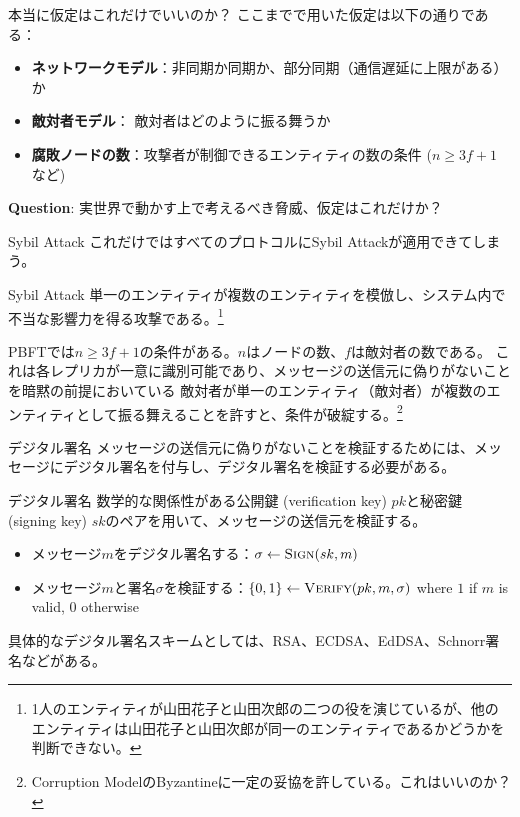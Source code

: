 \documentclass[aspectratio=169,10pt]{beamer}
\newenvironment{proofblock}[1][]
{\begin{block}{#1}\vspace{0.5em}}
{\vspace{0.5em}\end{block}}
\newenvironment{outlineblock}[1][]
{\begin{tcolorbox}[colframe=black, colback=white, boxrule=1pt, boxsep=5pt]}
{\end{tcolorbox}}
\begin{document}
\begin{frame}{本当に仮定はこれだけでいいのか？}
ここまでで用いた仮定は以下の通りである：
\begin{itemize}
    \item \textbf{ネットワークモデル}：非同期か同期か、部分同期（通信遅延に上限がある）か
    \item \textbf{敵対者モデル}： 敵対者はどのように振る舞うか
    \item \textbf{腐敗ノードの数}：攻撃者が制御できるエンティティの数の条件 ($n \geq 3f+1$ など)
\end{itemize}

\textbf{Question}: 実世界で動かす上で考えるべき脅威、仮定はこれだけか？
\end{frame}

\begin{frame}{Sybil Attack}
これだけではすべてのプロトコルにSybil Attackが適用できてしまう。

\begin{proofblock}[Sybil Attack]
単一のエンティティが複数のエンティティを模倣し、システム内で不当な影響力を得る攻撃である。\footnote{1人のエンティティが山田花子と山田次郎の二つの役を演じているが、他のエンティティは山田花子と山田次郎が同一のエンティティであるかどうかを判断できない。}
\end{proofblock}

\begin{outlineblock}[Sybil Attackの条件]
    PBFTでは$n \geq 3f+1$の条件がある。$n$はノードの数、$f$は敵対者の数である。
    これは各レプリカが一意に識別可能であり、メッセージの送信元に偽りがないことを暗黙の前提においている
    敵対者が単一のエンティティ（敵対者）が複数のエンティティとして振る舞えることを許すと、条件が破綻する。\footnote{Corruption ModelのByzantineに一定の妥協を許している。これはいいのか？}
\end{outlineblock}
\end{frame}

\begin{frame}{デジタル署名}
メッセージの送信元に偽りがないことを検証するためには、メッセージにデジタル署名を付与し、デジタル署名を検証する必要がある。

\begin{proofblock}[デジタル署名]
    数学的な関係性がある公開鍵 (verification key) $pk$と秘密鍵 (signing key) $sk$のペアを用いて、メッセージの送信元を検証する。
    \begin{itemize}
        \item メッセージ$m$をデジタル署名する：$\sigma \gets \textsc{Sign}(sk, m)$
        \item メッセージ$m$と署名$\sigma$を検証する：$\{0, 1\} \gets \textsc{Verify}(pk, m, \sigma)$ where $1$ if $m$ is valid, $0$ otherwise
    \end{itemize}
\end{proofblock}
具体的なデジタル署名スキームとしては、RSA、ECDSA、EdDSA、Schnorr署名などがある。
\end{frame}
\end{document}
